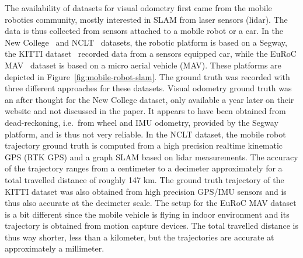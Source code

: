 The availability of datasets for visual odometry first came from the mobile robotics community,
mostly interested in SLAM from laser sensors (lidar).
The data is thus collected from sensors attached to a mobile robot or a car.
In the New College~\cite{smith2009new} and NCLT~\cite{carlevaris2016university} datasets,
the robotic platform is based on a Segway, the KITTI dataset~\cite{geiger2013vision}
recorded data from a sensors equipped car,
while the EuRoC MAV~\cite{burri2016euroc}
dataset is based on a micro aerial vehicle (MAV).
These platforms are depicted in Figure~\ref{fig:mobile-robot-slam}.
The ground truth was recorded with three different approaches for these datasets.
Visual odometry ground truth was an after thought for the New College dataset,
only available a year later on their website and not discussed in the paper.
It appears to have been obtained from dead-reckoning, i.e.\ from wheel and IMU odometry,
provided by the Segway platform, and is thus not very reliable.
In the NCLT dataset, the mobile robot trajectory ground truth is computed from
a high precision realtime kinematic GPS (RTK GPS) and a graph SLAM based on lidar measurements.
The accuracy of the trajectory ranges from a centimeter to a decimeter approximately for a total
travelled distance of roughly 147 km.
The ground truth trajectory of the KITTI dataset was also obtained from high precision
GPS/IMU sensors and is thus also accurate at the decimeter scale.
The setup for the EuRoC MAV dataset is a bit different since the mobile vehicle
is flying in indoor environment and its trajectory is obtained from motion capture devices.
The total travelled distance is thus way shorter, less than a kilometer,
but the trajectories are accurate at approximately a millimeter.

